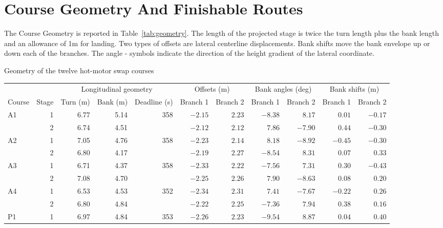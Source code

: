 \documentclass{ieeeaccess}
\makeatletter
\newenvironment{appendixdisplay}[1]
  {\par\addvspace{4pt}\noindent\begin{minipage}{\linewidth}\def\@captype{#1}}
  {\end{minipage}\par\addvspace{6pt}}
\makeatother
\begin{document}
\appendices

\section{Course Geometry And Finishable Routes}
\label{app:course-data}

The Course Geometry is reported in Table~\ref{tab:geometry}. The length of the projected stage is twice the turn length plus the bank length and an allowance of 1m for landing. Two types of offsets are lateral centerline displacements. Bank shifts move the bank envelope up or down each of the branches. The angle - symbols indicate the direction of the height gradient of the lateral coordinate.

\begin{appendixdisplay}{table}
\caption{Geometry of the twelve hot-motor swap courses}
\label{tab:geometry}
\centering
\footnotesize
\setlength{\tabcolsep}{4pt}
\renewcommand{\arraystretch}{1.00}
\begin{tabular*}{\linewidth}{@{\extracolsep{\fill}}lrrrrrrrrrr@{}}
\hline
& & \multicolumn{3}{c}{Longitudinal geometry} & \multicolumn{2}{c}{Offsets (m)} & \multicolumn{2}{c}{Bank angles (deg)} & \multicolumn{2}{c}{Bank shifts (m)} \\
\cline{3-5}\cline{6-7}\cline{8-9}\cline{10-11}
Course & Stage & Turn (m) & Bank (m) & Deadline (s) & Branch 1 & Branch 2 & Branch 1 & Branch 2 & Branch 1 & Branch 2 \\
\hline
A1 & 1 & 6.77 & 5.14 & 358 & $-2.15$ & $2.23$ & $-8.38$ & $8.17$ & $0.01$ & $-0.17$ \\
 & 2 & 6.74 & 4.51 &  & $-2.12$ & $2.12$ & $7.86$ & $-7.90$ & $0.44$ & $-0.30$ \\
A2 & 1 & 7.05 & 4.76 & 358 & $-2.23$ & $2.14$ & $8.18$ & $-8.92$ & $-0.45$ & $-0.30$ \\
 & 2 & 6.80 & 4.17 &  & $-2.19$ & $2.27$ & $-8.54$ & $8.31$ & $0.07$ & $0.33$ \\
A3 & 1 & 6.71 & 4.37 & 358 & $-2.33$ & $2.22$ & $-7.56$ & $7.31$ & $0.30$ & $-0.43$ \\
 & 2 & 7.08 & 4.70 &  & $-2.25$ & $2.26$ & $7.90$ & $-8.63$ & $0.08$ & $0.20$ \\
A4 & 1 & 6.53 & 4.53 & 352 & $-2.34$ & $2.31$ & $7.41$ & $-7.67$ & $-0.22$ & $0.26$ \\
 & 2 & 6.80 & 4.84 &  & $-2.22$ & $2.25$ & $-7.36$ & $7.94$ & $0.38$ & $0.16$ \\
\hline
P1 & 1 & 6.97 & 4.84 & 353 & $-2.26$ & $2.23$ & $-9.54$ & $8.87$ & $0.04$ & $0.40$ \\

\end{tabular*}
\end{appendixdisplay}
\end{document}
